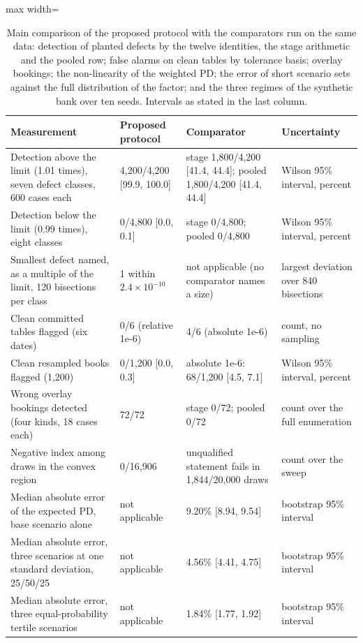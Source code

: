 \begin{table}[tbp]
\centering
\small
\caption{Main comparison of the proposed protocol with the comparators run on the same data: detection of planted defects by the twelve identities, the stage arithmetic and the pooled row; false alarms on clean tables by tolerance basis; overlay bookings; the non-linearity of the weighted PD; the error of short scenario sets against the full distribution of the factor; and the three regimes of the synthetic bank over ten seeds. Intervals as stated in the last column.}
\label{tab:main-results}
\begin{adjustbox}{max width=\textwidth}
\begin{tabular}{p{5.4cm}p{3.3cm}p{4.0cm}p{3.0cm}}
\toprule
Measurement & Proposed protocol & Comparator & Uncertainty \\
\midrule
Detection above the limit (1.01 times), seven defect classes, 600 cases each & 4,200/4,200 [99.9, 100.0] & stage 1,800/4,200 [41.4, 44.4]; pooled 1,800/4,200 [41.4, 44.4] & Wilson 95\% interval, percent \\
Detection below the limit (0.99 times), eight classes & 0/4,800 [0.0, 0.1] & stage 0/4,800; pooled 0/4,800 & Wilson 95\% interval, percent \\
Smallest defect named, as a multiple of the limit, 120 bisections per class & 1 within $2.4\times10^{-10}$ & not applicable (no comparator names a size) & largest deviation over 840 bisections \\
Clean committed tables flagged (six dates) & 0/6 (relative 1e-6) & 4/6 (absolute 1e-6) & count, no sampling \\
Clean resampled books flagged (1,200) & 0/1,200 [0.0, 0.3] & absolute 1e-6: 68/1,200 [4.5, 7.1] & Wilson 95\% interval, percent \\
Wrong overlay bookings detected (four kinds, 18 cases each) & 72/72 & stage 0/72; pooled 0/72 & count over the full enumeration \\
Negative index among draws in the convex region & 0/16,906 & unqualified statement fails in 1,844/20,000 draws & count over the sweep \\
Median absolute error of the expected PD, base scenario alone & not applicable & 9.20\% [8.94, 9.54] & bootstrap 95\% interval \\
Median absolute error, three scenarios at one standard deviation, 25/50/25 & not applicable & 4.56\% [4.41, 4.75] & bootstrap 95\% interval \\
Median absolute error, three equal-probability tertile scenarios & not applicable & 1.84\% [1.77, 1.92] & bootstrap 95\% interval \\

\end{tabular}
\end{adjustbox}
\end{table}
